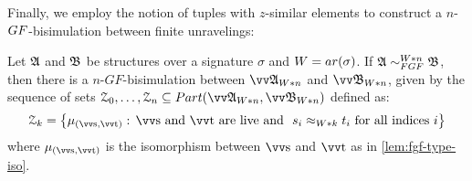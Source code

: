 Finally, we employ the notion of tuples with $z$-similar elements to construct a $n$-$\GF$-bisimulation between finite unravelings:
\begin{lemma}
  Let ${\mathfrak{A}}$ and ${\mathfrak{B}}$ be structures over a signature $\sigma$ and $W = \arity(\sigma)$.
  If $\str{A} \bisimto_{\FGF}^{W * n} \str{B}$, then there is a $n$-$GF$-bisimulation between $\unravel{A}_{W * n}$ and $\unravel{B}_{W * n}$, given by the sequence of sets $\bisimZ_{0}, \ldots, \bisimZ_{n} \subseteq \PartIso{\unravel{A}_{W * n}}{\unravel{B}_{W * n}}$ defined as:
  \begin{equation*}
    \bisimZ_{k} = \left\{
      \mu_{(\elemtuptuples, \elemtuptuplet)}:\,
      \elemtuptuples\ \text{and}\ \elemtuptuplet\ \text{are live and}\ \
      s_{i} \approx_{W * k} t_{i}\ \text{for all indices $i$}
    \right\}
  \end{equation*}
  where $\mu_{(\elemtuptuples, \elemtuptuplet)}$ is the isomorphism between $\elemtuptuples$ and $\elemtuptuplet$ as in \cref{lem:fgf-type-iso}.
\end{lemma}
